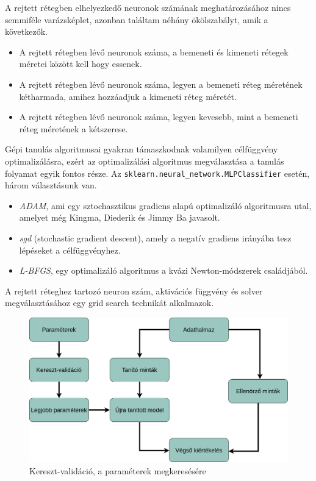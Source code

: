 A rejtett rétegben elhelyezkedő neuronok számának meghatározásához nincs semmiféle varázsképlet, azonban találtam néhány ökölszabályt, amik a következők. 
\begin{itemize}
\item A rejtett rétegben lévő neuronok száma, a bemeneti és kimeneti rétegek méretei között kell hogy essenek.
\item A rejtett rétegben lévő neuronok száma, legyen a bemeneti réteg méretének kétharmada, amihez hozzáadjuk a kimeneti réteg méretét.
\item A rejtett rétegben lévő neuronok száma, legyen kevesebb, mint a bemeneti réteg méretének a kétszerese.
\end{itemize}

Gépi tanulás algoritmusai gyakran támaszkodnak valamilyen célfüggvény optimalizálásra, ezért az optimalizálási algoritmus megválasztása a tanulás folyamat egyik fontos része.
Az \texttt{sklearn.neural\_network.MLPClassifier} esetén, három választásunk van.
\begin{itemize}
\item \textit{ADAM}, ami egy sztochasztikus gradiens alapú optimalizáló algoritmusra utal, amelyet még Kingma, Diederik és Jimmy Ba javasolt.
\item \textit{sgd} (stochastic gradient descent), amely a negatív gradiens irányába tesz lépéseket a célfüggvényhez.
\item \textit{L-BFGS}, egy  optimalizáló algoritmus a kvázi Newton-módszerek családjából.
\end{itemize}

A rejtett réteghez tartozó neuron szám, aktivációs függvény és solver megválasztásához egy grid search technikát alkalmazok.
\begin{figure}[h!]
\centering
\includegraphics[scale=0.3]{images/gridSearch.png}
\caption{Kereszt-validáció, a paraméterek megkeresésére}
\label{fig:neuralnetwork}
\end{figure}

